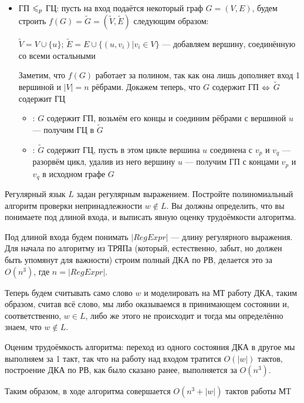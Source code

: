 \documentclass[a4paper,12pt]{article}
\begin{document}
\begin{solution}
\begin{itemize}
		\item ГП $\leqslant_p$ ГЦ: пусть на вход подаётся некоторый граф $G = (V, E)$, будем строить $f(G) = \tilde{G} = (\tilde{V}, \tilde{E})$ следующим образом:
		
		$\tilde{V} = V \cup \{u\}$; $\tilde{E} = E \cup \{(u, v_i) | v_i \in V\}$ --- добавляем вершину, соединённую со всеми остальными
		
		Заметим, что $f(G)$ работает за полином, так как она лишь дополняет вход 1 вершиной и $|V| = n$ рёбрами. Докажем теперь, что $G$ содержит ГП $\Leftrightarrow$ $\tilde{G}$ содержит ГЦ
		
		\begin{itemize}
			\item \Ra: $G$ содержит ГП, возьмём его концы и соединим рёбрами с вершиной $u$ --- получим ГЦ в $\tilde{G}$
			
			\item \La: $\tilde{G}$ содержит ГЦ, пусть в этом цикле вершина $u$ соединена с $v_p$ и $v_q$ --- разорвём цикл, удалив из него вершину $u$ --- получим ГП с концами $v_p$ и $v_q$ в исходном графе $G$
		\end{itemize}
		
	\end{itemize}
\end{solution}

\begin{tasknum}{7}
	Регулярный язык $L$ задан регулярным выражением. Постройте полиномиальный алгоритм проверки непринадлежности $w\notin L$. Вы должны определить, что вы понимаете под длиной входа, и выписать явную  оценку трудоёмкости алгоритма.
\end{tasknum}

\begin{solution}
	
	Под длиной входа будем понимать $|RegExpr|$ --- длину регулярного выражения. Для начала по алгоритму из ТРЯПа (который, естественно, забыт, но должен быть упомянут для важности) строим полный ДКА по РВ, делается это за $O(n^3)$, где $n = |RegExpr|$.
	
	Теперь будем считывать само слово $w$ и моделировать на МТ работу ДКА, таким образом, считав всё слово, мы либо оказываемся в принимающем состоянии и, соответственно, $w\in L$, либо же этого не происходит и тогда мы определённо знаем, что $w\notin L$.
	
	Оценим трудоёмкость алгоритма: переход из одного состояния ДКА в другое мы выполняем за 1 такт, так что на работу над входом тратится $O(|w|)$ тактов, построение ДКА по РВ, как было сказано ранее, выполняется за $O(n^3)$.
	
	 Таким образом, в ходе алгоритма совершается $O(n^3 + |w|)$ тактов работы МТ
	
\end{solution}
\end{document}
